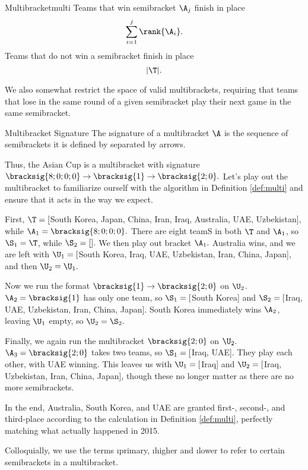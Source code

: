 {\begin{definition}{Multibracket}{multi}
        Teams that win semibracket $\A_j$ finish in place $$\sum_{i=1}^{j} \rank{\A_i}.$$
        Teams that do not win a semibracket finish in place $$|\T|.$$

        We also somewhat restrict the space of valid multibrackets, requiring that teams that lose in the same round of a given semibracket play their next game in the same semibracket.
    \end{definition}

    \begin{definition}{Multibracket Signature}{}
        The \i{signature} of a multibracket $\A$ is the sequence of semibrackets it is defined by separated by arrows.
    \end{definition}

    Thus, the Asian Cup is a multibracket with signature $\bracksig{8;0;0;0} \to \bracksig{1} \to \bracksig{2;0}.$ Let's play out the multibracket to familiarize ourself with the algorithm in Definition \ref{def:multi} and ensure that it acts in the way we expect.

    First, $\T = [$South Korea, Japan, China, Iran, Iraq, Australia, UAE, Uzbekistan], while $\A_1 = \bracksig{8;0;0;0}.$ There are eight teamS in both $\T$ and $\A_1$, so $\S_1 = \T$, while $\S_2 = [].$ We then play out bracket $\A_1.$ Australia wins, and we are left with $\U_1 = [$South Korea, Iraq, UAE, Uzbekistan, Iran, China, Japan], and then $\U_2 = \U_1.$

    Now we run the format $\bracksig{1} \to \bracksig{2;0}$ on $\U_2$. $\A_2 = \bracksig{1}$ has only one team, so $\S_1 =[$South Korea] and $\S_2 =[$Iraq, UAE, Uzbekistan, Iran, China, Japan]. South Korea immediately wins $\A_2$, leaving $\U_1$ empty, so $\U_2 = \S_2.$

    Finally, we again run the multibracket $\bracksig{2;0}$ on $\U_2.$ $\A_3 = \bracksig{2;0}$ takes two teams, so $\S_1 =[$Iraq, UAE]. They play each other, with UAE winning. This leaves us with $\U_1 = [$Iraq] and $\U_2 = [$Iraq, Uzbekistan, Iran, China, Japan], though these no longer matter as there are no more semibrackets.

    In the end, Australia, South Korea, and UAE are granted first-, second-, and third-place according to the calculation in Definition \ref{def:multi}, perfectly matching what actually happened in 2015.

    Colloquially, we use the terms \i{primary}, \i{higher} and \i{lower} to refer to certain semibrackets in a multibracket.

}
